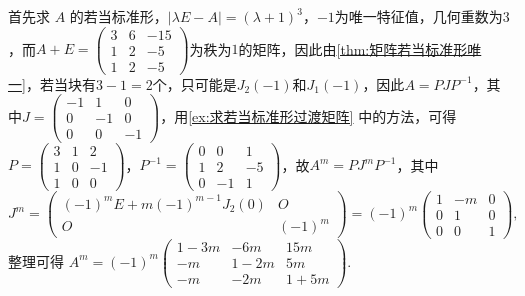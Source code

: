\begin{solution}
    首先求 $A$ 的若当标准形，$|\lambda E - A|=(\lambda + 1)^3$，$-1$为唯一特征值，几何重数为$3$，而$A+E=\begin{pmatrix}
            3 & 6 & -15 \\ 1 & 2 & -5 \\ 1 & 2 & -5
        \end{pmatrix}$为秩为$1$的矩阵，因此由\autoref{thm:矩阵若当标准形唯一}，若当块有$3-1=2$个，只可能是$J_2(-1)$和$J_1(-1)$，因此$A=PJP^{-1}$，其中$J=\begin{pmatrix}
            -1 & 1 & 0 \\ 0 & -1 & 0 \\ 0 & 0 & -1
        \end{pmatrix}$，用\autoref{ex:求若当标准形过渡矩阵} 中的方法，可得$P=\begin{pmatrix}
            3 & 1 & 2 \\ 1 & 0 & -1 \\ 1 & 0 & 0
        \end{pmatrix}$，$P^{-1}=\begin{pmatrix}
            0 & 0 & 1 \\ 1 & 2 & -5 \\ 0 & -1 & 1
        \end{pmatrix}$，故$A^m=PJ^mP^{-1}$，其中
        \[
            J^m=\begin{pmatrix}
                (-1)^m E + m(-1)^{m-1}J_2(0) & O \\ O & (-1)^m
            \end{pmatrix}=(-1)^m\begin{pmatrix}
                1 & -m & 0 \\ 0 & 1 & 0 \\ 0 & 0 & 1
            \end{pmatrix},
        \]
        整理可得 $A^m=(-1)^m\begin{pmatrix}
            1-3m & -6m & 15m \\ -m & 1-2m & 5m \\ -m & -2m & 1+5m
        \end{pmatrix}$.
\end{solution}

